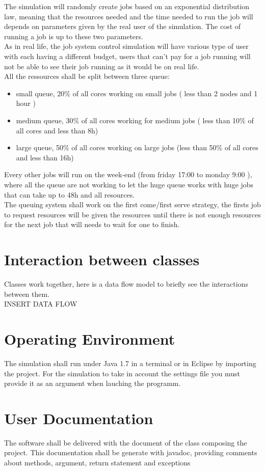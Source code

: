 \documentclass{scrreprt}
\begin{document}
The simulation will randomly create jobs based on an exponential distribution law, meaning that the resources needed and the time needed to run the job will depends on parameters given by the real user of the simulation. The cost of running a job is up to these two parameters.\\
As in real life, the job system control simulation will have various type of user with each having a different budget, users that can't pay for a job running will not be able to see their job running as it would be on real life.\\
All the ressources shall be split between three queue:\begin{itemize}
\item small queue, 20\% of all cores working on small jobs ( less than 2 nodes and 1 hour )
\item medium queue, 30\% of all cores working for medium jobs ( less than 10\% of all cores and less than 8h)
\item large queue, 50\% of all cores working on large jobs (less than 50\% of all cores and less than 16h)
\end{itemize}
Every other jobs will run on the week-end (from friday 17:00 to monday 9:00 ), where all the queue are not working to let the huge queue works with huge jobs that can take up to 48h and all resources.\\
The queuing system shall work on the first come/first serve strategy, the firsts job to request resources will be given the resources until there is not enough resources for the next job that will needs to wait for one to finish.

\section{Interaction between classes}
Classes work together, here is a data flow model to briefly see the interactions between them.\\INSERT DATA FLOW

\section{Operating Environment}
The simulation shall run under Java 1.7 in a terminal or in Eclipse by importing the project. For the simulation to take in account the settings file you must provide it as an argument when lauching the programm.


\section{User Documentation}
The software shall be delivered with the document of the class composing the project. This documentation shall be generate with javadoc, providing comments about methods, argument, return statement and exceptions
\end{document}
